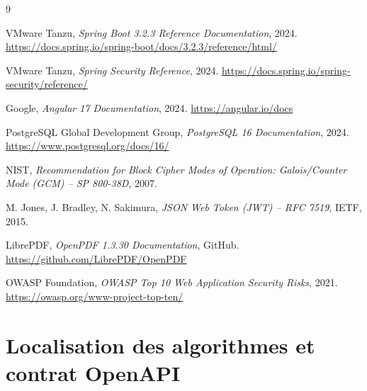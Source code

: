 \begin{thebibliography}{9}

VMware Tanzu, \textit{Spring Boot 3.2.3 Reference Documentation}, 2024. \url{https://docs.spring.io/spring-boot/docs/3.2.3/reference/html/}

VMware Tanzu, \textit{Spring Security Reference}, 2024. \url{https://docs.spring.io/spring-security/reference/}

Google, \textit{Angular 17 Documentation}, 2024. \url{https://angular.io/docs}

PostgreSQL Global Development Group, \textit{PostgreSQL 16 Documentation}, 2024. \url{https://www.postgresql.org/docs/16/}

NIST, \textit{Recommendation for Block Cipher Modes of Operation: Galois/Counter Mode (GCM) -- SP 800-38D}, 2007.

M. Jones, J. Bradley, N. Sakimura, \textit{JSON Web Token (JWT) -- RFC 7519}, IETF, 2015.

LibrePDF, \textit{OpenPDF 1.3.30 Documentation}, GitHub. \url{https://github.com/LibrePDF/OpenPDF}

OWASP Foundation, \textit{OWASP Top 10 Web Application Security Risks}, 2021. \url{https://owasp.org/www-project-top-ten/}

\end{thebibliography}

\appendix

\chapter{Localisation des algorithmes et contrat OpenAPI}

